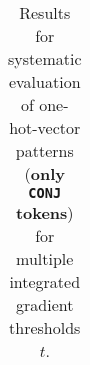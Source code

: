 \begin{table}[t]
\begin{tabular}{lllllll}

\hline
\end{tabular}
\caption[Model Evaluation for only \texttt{CONJ} tokens]{Results for systematic evaluation of one-hot-vector patterns (\textbf{only \texttt{CONJ} tokens}) for multiple integrated gradient thresholds $t$.}
\label{tab:evalResultsCONJ}
\end{table}
	